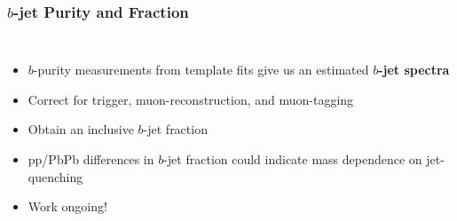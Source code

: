 \begin{frame}
  \frametitle{\textbf{$b$-jet Purity and Fraction}}
  \begin{columns}
    \begin{itemize}
    \item $b$-purity measurements from template fits give us an estimated \textbf{$b$-jet spectra}
    \item Correct for trigger, muon-reconstruction, and muon-tagging
    \item Obtain an inclusive $b$-jet fraction
    \item pp/PbPb differences in $b$-jet fraction could indicate mass dependence on jet-quenching
    \item Work ongoing!
    \end{itemize}
    \centering
    
  \end{columns}


\end{frame}

